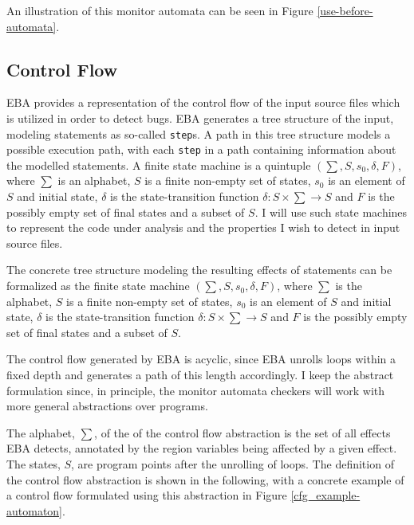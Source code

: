An illustration of this monitor automata can be seen in Figure \ref{use-before-automata}. 

\subsection{Control Flow}

EBA provides a representation of the control flow of the input source files which is utilized in order to detect bugs. EBA generates a tree structure of the input, modeling statements as so-called \texttt{step}s. A path in this tree structure models a possible execution path, with each \texttt{step} in a path containing information about the modelled statements. A finite state machine is a quintuple $(\sum, S, s_0, \delta, F)$, where $\sum$ is an alphabet, $S$ is a finite non-empty set of states, $s_0$ is an element of $S$ and initial state, $\delta$ is the state-transition function $\delta: S \times \sum \rightarrow S$ and $F$ is the possibly empty set of final states and a subset of $S$. I will use such state machines to represent the code under analysis and the properties I wish to detect in input source files. 

\newpar The concrete tree structure modeling the resulting effects of statements can be formalized as the finite state machine $(\sum, S, s_0, \delta, F)$, where $\sum$ is the alphabet, $S$ is a finite non-empty set of states, $s_0$ is an element of $S$ and initial state, $\delta$ is the state-transition function $\delta: S \times \sum \rightarrow S$ and $F$ is the possibly empty set of final states and a subset of $S$. 

\newpar The control flow generated by EBA is acyclic, since EBA unrolls loops within a fixed depth and generates a path of this length accordingly. I keep the abstract formulation since, in principle, the monitor automata checkers will work with more general abstractions over programs.

\newpar The alphabet, $\sum$, of the of the control flow abstraction is the set of all effects EBA detects, annotated by the region variables being affected by a given effect. The states, $S$, are program points after the unrolling of loops. The definition of the control flow abstraction is shown in the following, with a concrete example of a control flow formulated using this abstraction in Figure \ref{cfg_example-automaton}. 

